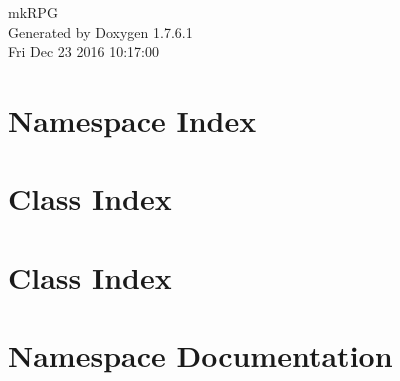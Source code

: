 \documentclass[a4paper]{book}
\begin{document}
\hypersetup{pageanchor=false,citecolor=blue}
\begin{titlepage}
\vspace*{7cm}
\begin{center}
{\Large mk\-R\-P\-G }\\
\vspace*{1cm}
{\large \-Generated by Doxygen 1.7.6.1}\\
\vspace*{0.5cm}
{\small Fri Dec 23 2016 10:17:00}\\
\end{center}
\end{titlepage}
\clearemptydoublepage
{}
\tableofcontents
\clearemptydoublepage
{}
\hypersetup{pageanchor=true,citecolor=blue}
\chapter{\-Namespace \-Index}

\chapter{\-Class \-Index}

\chapter{\-Class \-Index}

\chapter{\-Namespace \-Documentation}


\end{document}
